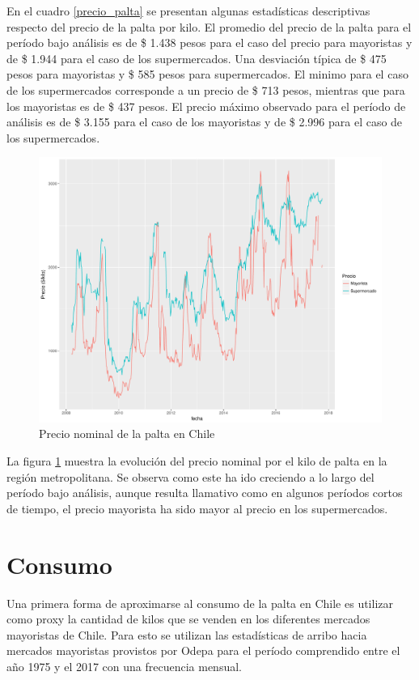 En el cuadro \ref{precio_palta} se presentan algunas estadísticas descriptivas respecto del precio de la palta por kilo. El promedio del precio de la palta para el período bajo análisis es de \$ 1.438 pesos para el caso del precio para mayoristas y de \$ 1.944 para el caso de los supermercados. Una desviación típica de \$ 475 pesos para mayoristas y \$ 585 pesos para supermercados. El minimo para el caso de los supermercados corresponde a un precio de \$ 713 pesos, mientras que para los mayoristas es de \$ 437 pesos. El precio máximo observado para el período de análisis es de \$ 3.155 para el caso de los mayoristas y de \$ 2.996 para el caso de los supermercados. 

\begin{figure}
	\caption{Precio nominal de la palta en Chile}\label{precios}
	\includegraphics[scale = 0.4]{fig_market/prices.pdf}
\end{figure}

La figura \ref{precios} muestra la evolución del precio nominal por el kilo de palta en la región metropolitana. Se observa como este ha ido creciendo a lo largo del período bajo análisis, aunque resulta llamativo como en algunos períodos cortos de tiempo, el precio mayorista ha sido mayor al precio en los supermercados. 

\section{Consumo}

Una primera forma de aproximarse al consumo de la palta en Chile es utilizar como proxy la cantidad de kilos que se venden en los diferentes mercados mayoristas de Chile. Para esto se utilizan las estadísticas de arribo hacia mercados mayoristas provistos por Odepa para el período comprendido entre el año 1975 y el 2017 con una frecuencia mensual.

